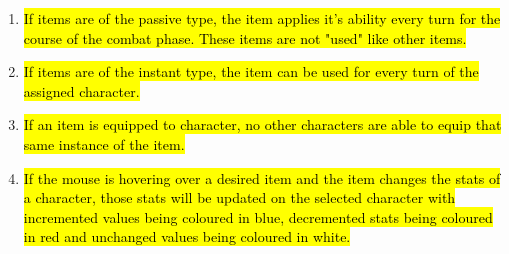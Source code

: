 \documentclass{article}
\begin{document}
\begin{enumerate}[{AGR}1. ]
	\item \hl{If items are of the passive type, the item applies it's ability every turn for the course of the combat phase. These items are not "used" like other items.}
	\item \hl{If items are of the instant type, the item can be used for every turn of the assigned character.}
	\item \hl{If an item is equipped to character, no other characters are able to equip that same instance of the item.}
	\item \hl{If the mouse is hovering over a desired item and the item changes the stats of a character, those stats will be updated on the selected character with incremented values being coloured in blue, decremented stats being coloured in red and unchanged values being coloured in white.}
\end{enumerate}
\end{document}
